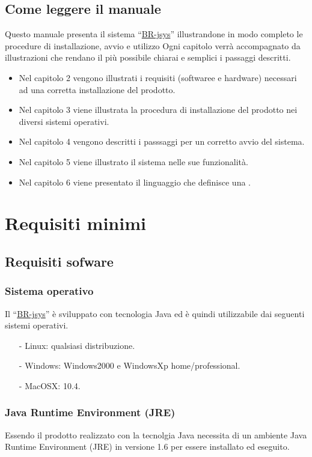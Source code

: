 \section{Come leggere il manuale}
 Questo manuale presenta il sistema ``\underline{BR-jsys}'' illustrandone in modo completo le procedure di installazione, avvio e utilizzo 
Ogni capitolo verr\`a accompagnato da illustrazioni che rendano il pi\`u possibile chiarai e semplici i passaggi descritti.
 \begin{itemize}
 \item Nel capitolo 2 vengono illustrati i requisiti (softwaree e hardware) necessari ad una corretta installazione del prodotto.
\item Nel capitolo 3 viene illustrata la procedura di installazione del prodotto nei diversi sistemi operativi.
\item Nel capitolo 4 vengono descritti i passsaggi per un corretto avvio del sistema.
\item Nel capitolo 5 viene illustrato il sistema nelle sue funzionalit\`a.
\item Nel capitolo 6 viene presentato il linguaggio che definisce una \br.
 \end{itemize}


\chapter{Requisiti minimi}
\section{Requisiti sofware }
\subsection{Sistema operativo}
Il ``\underline{BR-jsys}'' \`e sviluppato con tecnologia Java ed \`e quindi utilizzabile dai seguenti sistemi operativi.
\begin{itemize}
\item[-] Linux: qualsiasi distribuzione.
\item[-] Windows: Windows2000 e WindowsXp home/professional.
\item[-] MacOSX: 10.4.
\end{itemize}
\subsection{Java Runtime Environment (JRE)}
Essendo il prodotto realizzato con la tecnolgia Java necessita di un ambiente Java Runtime Environment (JRE) in versione 1.6 per essere installato ed eseguito.
